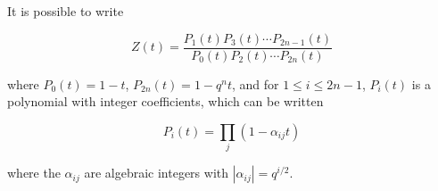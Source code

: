 It is possible to write

$$Z(t) = \frac{P_1(t) P_3(t) \cdots P_{2n-1}(t)}{P_0(t) P_2(t) \cdots P_{2n}(t)}$$

where $P_0(t) = 1-t$, $P_{2n}(t) = 1-q^n t$, and for $1 \leqslant i \leqslant 2n-1$, $P_i(t)$ is a polynomial with integer coefficients, which can be written

$$P_i(t) = \prod_j (1 - \alpha_{ij} t)$$

where the $\alpha_{ij}$ are algebraic integers with $|\alpha_{ij}| = q^{i/2}$.